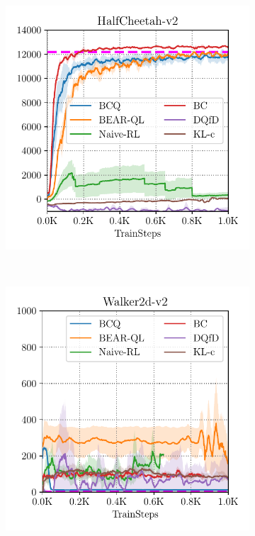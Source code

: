 \begin{figure}[t!]
\begin{subfigure}[t]{0.23\textwidth}
        \includegraphics[width=0.99\linewidth]{chapters/bear/images/images_camera_ready/cheetah_optimal_camera_ready_new.pdf}
    \end{subfigure}%
    ~ 
    \begin{subfigure}[t]{0.23\textwidth}
        \centering
        \includegraphics[width=0.99\linewidth]{chapters/bear/images/images_camera_ready/walker_random_camera_ready.pdf}

\end{subfigure}
\end{figure}
